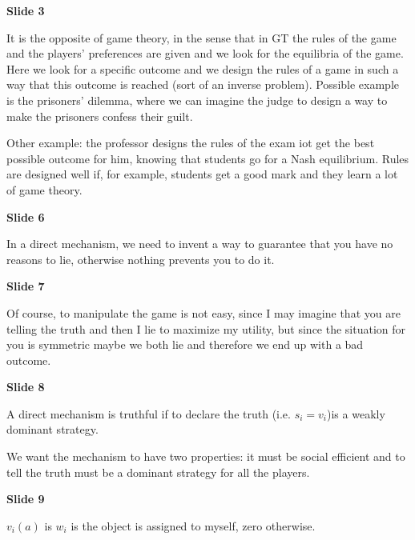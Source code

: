 
%



\bigskip
\noindent \textbf{Slide 3}

\noindent It is the opposite of game theory, in the sense that in GT the rules 
of the game and the players' preferences are given and we look for the 
equilibria of the game. Here we look for a specific outcome and we design 
the rules of a game in such a way that this outcome is reached (sort of an 
inverse problem). Possible example is the prisoners' dilemma, where we can 
imagine the judge to design a way to make the prisoners confess their guilt. 

\noindent Other example: the professor designs the rules of the exam iot get 
the best possible outcome for him, knowing that students go for a Nash 
equilibrium. Rules are designed well if, for example, students get a good mark 
and they learn a lot of game theory.

\bigskip
\noindent \textbf{Slide 6}

\noindent In a direct mechanism, we need to invent a way to guarantee that you 
have no reasons to lie, otherwise nothing prevents you to do it.

\bigskip
\noindent \textbf{Slide 7}

\noindent Of course, to manipulate the game is not easy, since I may imagine 
that you are telling the truth and then I lie to maximize my utility, but 
since the situation for you is symmetric maybe we both lie and therefore we 
end up with a bad outcome.

\bigskip
\noindent \textbf{Slide 8}

\noindent A direct mechanism is truthful if to declare the truth (i.e. 
$s_i = v_i$)is a weakly dominant strategy.

\noindent We want the mechanism to have two properties: it must be social 
efficient and to tell the truth must be a dominant strategy for all the players.

\bigskip
\noindent \textbf{Slide 9}

\noindent $v_i(a)$ is $w_i$ is the object is assigned to myself, zero otherwise.

